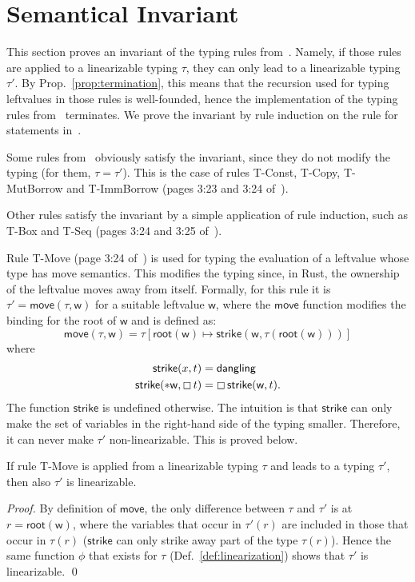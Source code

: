 \section{Semantical Invariant}\label{sec:invariant}

This section proves an invariant of the typing rules
from~\cite{Pearce21}. Namely,
if those rules are applied to a linearizable typing $\tau$,
they can only lead to a linearizable typing $\tau'$.
By Prop.~\ref{prop:termination}, this means that the recursion used for
typing leftvalues in those rules is well-founded,
hence the implementation of the typing rules from~\cite{Pearce21} terminates.
We prove the invariant by rule induction on the rule for statements in~\cite{Pearce21}.

Some rules from~\cite{Pearce21} obviously satisfy the invariant,
since they do not modify the typing (for them, $\tau=\tau'$).
This is the case of rules
\textsf{T-Const}, \textsf{T-Copy}, \textsf{T-MutBorrow} and
\textsf{T-ImmBorrow} (pages 3:23 and 3:24 of~\cite{Pearce21}).

Other rules satisfy the invariant by a simple application of
rule induction, such as \textsf{T-Box} and \textsf{T-Seq}
(pages 3:24 and 3:25 of~\cite{Pearce21}).

Rule \textsf{T-Move} (page 3:24 of~\cite{Pearce21})
is used for typing the evaluation of a leftvalue
whose type has move semantics. This modifies the typing since, in Rust,
the ownership of the leftvalue moves away from itself.
Formally, for this rule it is $\tau'=\mathsf{move}(\tau,\mathsf{w})$
for a suitable leftvalue $\mathsf{w}$,
where the $\mathsf{move}$ function
modifies the binding for the root of $\mathsf{w}$ and is defined as:
\[
\mathsf{move}(\tau,\mathsf{w})=\tau[\mathsf{root}(\mathsf{w})\mapsto
  \mathsf{strike}(\mathsf{w},\tau(\mathsf{root}(\mathsf{w})))]
\]
where
\begin{align*}
  \mathsf{strike}(x,t)&=\mathsf{dangling}\\
  \mathsf{strike}(\mathtt{*}\mathsf{w},\boxempty\,{t})&=
  \boxempty\,{\mathsf{strike}(\mathsf{w},t)}.
\end{align*}
The function $\mathsf{strike}$ is undefined otherwise. The intuition is that
$\mathsf{strike}$ can only make the set of variables in the right-hand side
of the typing smaller. Therefore, it can never make $\tau'$
non-linearizable. This is proved below.

\begin{lemma}\label{lem:move_invariant}
  If rule \textsf{T-Move} is applied from a linearizable typing $\tau$
  and leads to a typing $\tau'$, then also $\tau'$ is linearizable.
\end{lemma}
\begin{proof}
  By definition of $\mathsf{move}$, the only
  difference between $\tau$ and $\tau'$ is at $r=\mathsf{root}(\mathsf{w})$,
  where the variables that occur in $\tau'(r)$ are included in those that occur
  in $\tau(r)$ ($\mathsf{strike}$ can only strike away part of the type $\tau(r)$).
  Hence the same function $\phi$ that exists for $\tau$ (Def.~\ref{def:linearization})
  shows that $\tau'$ is linearizable.
  \qed
\end{proof}

